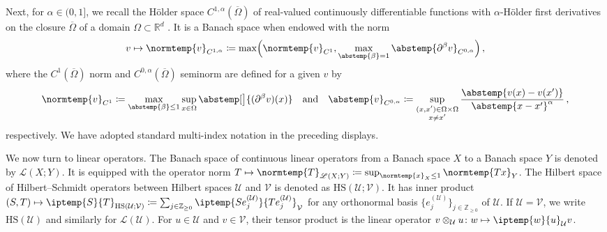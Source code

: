 \documentclass[pdflatex,sn-mathphys-num]{sn-jnl-preprint}
\newcommand{\Z}{\mathbb{Z}}
\newcommand{\R}{\mathbb{R}}
\newcommand{\cV}{\mathcal{V}}
\newcommand{\cU}{\mathcal{U}}
\newcommand{\sL}{\mathscr{L}}
\newcommand{\ip}{\iptemp}
\newcommand{\norm}{\normtemp}
\newcommand{\abs}{\abstemp}
\newcommand{\defeq}{\coloneqq} %
\newcommand{\HS}{\mathrm{HS}} %
\newcommand{\al}{\alpha}
\def\qa{\quad\text{and}\quad}
\theoremstyle{thmstyleone}%
\theoremstyle{thmstyletwo}%
\theoremstyle{thmstylethree}%
\numberwithin{equation}{section}
\numberwithin{theorem}{section}
\begin{document}
Next, for $\al\in(0,1]$, we recall the H\"older space $C^{1,\al}(\overline{\Omega})$ of real-valued continuously differentiable functions with $\al$-H\"older first derivatives on the closure $\overline{\Omega}$ of a domain $\Omega\subset\R^d$ \cite[Sec.~1.29]{adams2003sobolev}. It is a Banach space when endowed with the norm
\begin{align}
    v\mapsto \norm{v}_{C^{1,\al}}\defeq\max\Bigl(\norm{v}_{C^1}, \max_{\abs{\beta}=1}\abs{\partial^\beta v}_{C^{0,\al}}\Bigr)\,,
\end{align}
where the $C^1(\overline{\Omega})$ norm and $C^{0,\al}(\overline{\Omega})$ seminorm are defined for a given $v$ by
\begin{align}
    \norm{v}_{C^1}\defeq \max_{\abs{\beta}\leq 1}\sup_{x\in\Omega}\abs[\big]{(\partial^\beta v)(x)}
    \qa
    \abs{v}_{C^{0,\al}}\defeq \sup_{\substack{(x,x')\in\Omega\times\Omega\\x\neq x'}}\frac{\abs{v(x)-v(x')}}{\abs{x-x'}^\al}\,,
\end{align}
respectively. We have adopted standard multi-index notation in the preceding displays.

We now turn to linear operators. The Banach space of continuous linear operators from a Banach space $X$ to a Banach space $Y$ is denoted by $\sL(X;Y)$. It is equipped with the operator norm $T\mapsto \norm{T}_{\sL(X;Y)}\defeq \sup_{\norm{x}_X\leq 1}\norm{Tx}_Y$. The Hilbert space of Hilbert--Schmidt operators between Hilbert spaces $\cU$ and $\cV$ is denoted as $\HS(\cU;\cV)$. It has inner product $(S,T)\mapsto \ip{S}{T}_{\HS(\cU;\cV)}\defeq \sum_{j\in\Z_{\geq 0}}\ip{Se_j^{(\cU)}}{Te_j^{(\cU)}}_{\cV}$ for any orthonormal basis $\{e_j^{(\cU)}\}_{j\in\Z_{\geq 0}}$ of $\cU$. If $\cU=\cV$, we write $\HS(\cU)$ and similarly for $\sL(\cU)$. For $u\in\cU$ and $v\in\cV$, their tensor product is the linear operator $v\otimes_\cU u\colon w\mapsto\ip{w}{u}_\cU v$.
\end{document}
